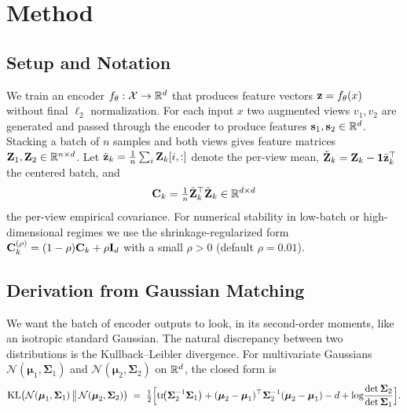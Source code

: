 \section{Method}
\label{sec:method}

\subsection{Setup and Notation}

We train an encoder $f_\theta : \mathcal{X} \to \mathbb{R}^d$ that produces feature vectors $\mathbf{z} = f_\theta(x)$ without final $\ell_2$ normalization. For each input $x$ two augmented views $v_1, v_2$ are generated and passed through the encoder to produce features $\mathbf{s}_1, \mathbf{s}_2 \in \mathbb{R}^d$. Stacking a batch of $n$ samples and both views gives feature matrices $\mathbf{Z}_1, \mathbf{Z}_2 \in \mathbb{R}^{n \times d}$. Let $\bar{\mathbf{z}}_k = \tfrac{1}{n}\sum_i \mathbf{Z}_k[i, :]$ denote the per-view mean, $\tilde{\mathbf{Z}}_k = \mathbf{Z}_k - \mathbf{1}\bar{\mathbf{z}}_k^\top$ the centered batch, and
\begin{equation}
    \mathbf{C}_k = \tfrac{1}{n}\tilde{\mathbf{Z}}_k^\top \tilde{\mathbf{Z}}_k \in \mathbb{R}^{d \times d}
\end{equation}
the per-view empirical covariance. For numerical stability in low-batch or high-dimensional regimes we use the shrinkage-regularized form $\mathbf{C}_k^{(\rho)} = (1-\rho)\mathbf{C}_k + \rho\mathbf{I}_d$ with a small $\rho > 0$ (default $\rho = 0.01$).

\subsection{Derivation from Gaussian Matching}
\label{sec:derivation}

We want the batch of encoder outputs to look, in its second-order moments, like an isotropic standard Gaussian. The natural discrepancy between two distributions is the Kullback--Leibler divergence. For multivariate Gaussians $\mathcal{N}(\boldsymbol{\mu}_1, \boldsymbol{\Sigma}_1)$ and $\mathcal{N}(\boldsymbol{\mu}_2, \boldsymbol{\Sigma}_2)$ on $\mathbb{R}^d$, the closed form is
\begin{equation}
\label{eq:gaussian_kl}
    \mathrm{KL}\!\left(\mathcal{N}(\boldsymbol{\mu}_1, \boldsymbol{\Sigma}_1) \,\big\|\, \mathcal{N}(\boldsymbol{\mu}_2, \boldsymbol{\Sigma}_2)\right)
    \;=\; \tfrac{1}{2}\Bigl[
        \operatorname{tr}\!\bigl(\boldsymbol{\Sigma}_2^{-1}\boldsymbol{\Sigma}_1\bigr)
        + (\boldsymbol{\mu}_2 - \boldsymbol{\mu}_1)^\top \boldsymbol{\Sigma}_2^{-1}(\boldsymbol{\mu}_2 - \boldsymbol{\mu}_1)
        - d
        + \log\!\frac{\det\boldsymbol{\Sigma}_2}{\det\boldsymbol{\Sigma}_1}
    \Bigr].
\end{equation}

